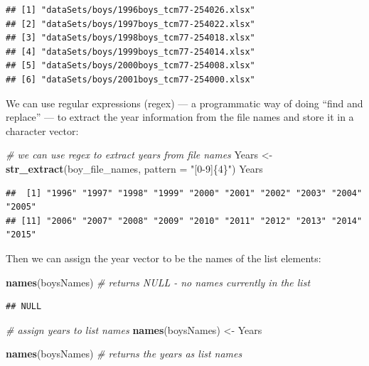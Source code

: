 \documentclass[
]{book}
\newenvironment{Shaded}{\begin{snugshade}}{\end{snugshade}}
\newcommand{\CommentTok}[1]{\textcolor[rgb]{0.56,0.35,0.01}{\textit{#1}}}
\newcommand{\DataTypeTok}[1]{\textcolor[rgb]{0.13,0.29,0.53}{#1}}
\newcommand{\KeywordTok}[1]{\textcolor[rgb]{0.13,0.29,0.53}{\textbf{#1}}}
\newcommand{\NormalTok}[1]{#1}
\newcommand{\StringTok}[1]{\textcolor[rgb]{0.31,0.60,0.02}{#1}}
\begin{document}
\begin{verbatim}
## [1] "dataSets/boys/1996boys_tcm77-254026.xlsx"
## [2] "dataSets/boys/1997boys_tcm77-254022.xlsx"
## [3] "dataSets/boys/1998boys_tcm77-254018.xlsx"
## [4] "dataSets/boys/1999boys_tcm77-254014.xlsx"
## [5] "dataSets/boys/2000boys_tcm77-254008.xlsx"
## [6] "dataSets/boys/2001boys_tcm77-254000.xlsx"
\end{verbatim}

We can use regular expressions (regex) --- a programmatic way of doing ``find and replace'' --- to extract the year information from the file names and store it in a character vector:

\begin{Shaded}
\begin{Highlighting}[]
\CommentTok{\# we can use regex to extract years from file names}
\NormalTok{Years \textless{}{-}}\StringTok{ }\KeywordTok{str\_extract}\NormalTok{(boy\_file\_names, }\DataTypeTok{pattern =} \StringTok{"[0{-}9]\{4\}"}\NormalTok{)}
\NormalTok{Years}
\end{Highlighting}
\end{Shaded}

\begin{verbatim}
##  [1] "1996" "1997" "1998" "1999" "2000" "2001" "2002" "2003" "2004" "2005"
## [11] "2006" "2007" "2008" "2009" "2010" "2011" "2012" "2013" "2014" "2015"
\end{verbatim}

Then we can assign the year vector to be the names of the list elements:

\begin{Shaded}
\begin{Highlighting}[]
\KeywordTok{names}\NormalTok{(boysNames) }\CommentTok{\# returns NULL {-} no names currently in the list}
\end{Highlighting}
\end{Shaded}

\begin{verbatim}
## NULL
\end{verbatim}

\begin{Shaded}
\begin{Highlighting}[]
\CommentTok{\# assign years to list names}
\KeywordTok{names}\NormalTok{(boysNames) \textless{}{-}}\StringTok{ }\NormalTok{Years }

\KeywordTok{names}\NormalTok{(boysNames) }\CommentTok{\# returns the years as list names}
\end{Highlighting}
\end{Shaded}
\end{document}
